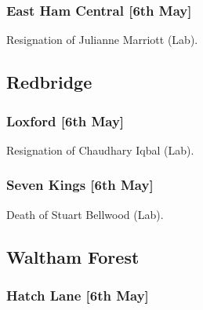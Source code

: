 \documentclass[a4paper,openany]{book}
\begin{document}
\begin{resultsiii}
\subsubsection*{East Ham Central \hspace*{\fill}\nolinebreak[1]%
	\enspace\hspace*{\fill}
	[6th May]}


Resignation of Julianne Marriott (Lab).

\subsection*{Redbridge}

\subsubsection*{Loxford \hspace*{\fill}\nolinebreak[1]%
	\enspace\hspace*{\fill}
	[6th May]}


Resignation of Chaudhary Iqbal (Lab).

\subsubsection*{Seven Kings \hspace*{\fill}\nolinebreak[1]%
	\enspace\hspace*{\fill}
	[6th May]}


Death of Stuart Bellwood (Lab).

\subsection*{Waltham Forest}

\subsubsection*{Hatch Lane \hspace*{\fill}\nolinebreak[1]%
	\enspace\hspace*{\fill}
	[6th May]}



\end{resultsiii}
\end{document}
